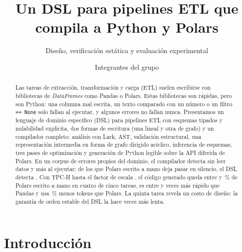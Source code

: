 \documentclass[sigplan,screen,nonacm]{acmart}
\begin{document}
\title{Un DSL para pipelines ETL que compila a Python y Polars}
\subtitle{Diseño, verificación estática y evaluación experimental}

\author{Integrantes del grupo}

\begin{abstract}
Las tareas de extracción, transformación y carga (ETL) suelen escribirse con bibliotecas
de \emph{DataFrames} como Pandas o Polars. Estas bibliotecas son rápidas, pero son Python:
una columna mal escrita, un texto comparado con un número o un filtro \texttt{== None} solo
fallan al ejecutar, y algunos errores no fallan nunca. Presentamos un lenguaje de dominio
específico (DSL) para pipelines ETL con esquemas tipados y nulabilidad explícita, dos formas
de escritura (una lineal y otra de grafo) y un compilador completo: análisis con Lark, AST,
validación estructural, una representación intermedia en forma de grafo dirigido acíclico,
inferencia de esquemas, tres pases de optimización y generación de Python legible sobre la
API diferida de Polars. En un corpus de \erroresTotal{} errores propios del dominio, el
compilador detecta \erroresCompilacion{} sin leer datos y \erroresEjecucion{} más al ejecutar;
de los \erroresSilenciososPolars{} que Polars escrito a mano deja pasar en silencio, el DSL
detecta \erroresSilenciososDetectados{}. Con TPC-H hasta el factor de escala \SFmax{}, el
código generado queda entre \dslPolarsMin{} y \dslPolarsMax{}\,\% de Polars escrito a mano en
cuatro de cinco tareas, es entre \pandasMin{} y \pandasMax{} veces más rápido que Pandas y usa
\tokensVsPolars{}\,\% menos tokens que Polars. La quinta tarea revela un costo de diseño: la
garantía de orden estable del DSL la hace \limpiezaRazon{} veces más lenta.
\end{abstract}


\maketitle

\section{Introducción}
\end{document}
